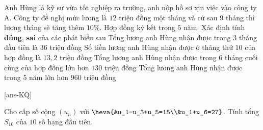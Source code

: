 \begin{ex}%
	Anh Hùng là kỹ sư vừa tốt nghiệp ra trường, anh nộp hồ sơ xin việc vào công ty A. Công ty đề nghị mức lương là $12$ triệu đồng một tháng và cứ sau $9$ tháng thì lương tháng sẽ tăng thêm $10\%$. Hợp đồng ký kết trong $5$ năm. Xác định tính \textbf{đúng}, \textbf{sai} của các phát biểu sau
	\choiceTF
	{\True Tổng lương anh Hùng nhận được trong $3$ tháng đầu tiên là $36$ triệu đồng}
	{\True Số tiền lương anh Hùng nhận được ở tháng thứ $10$ của hợp đồng là $13{,}2$ triệu đồng}
	{Tổng lương anh Hùng nhận được trong $6$ tháng cuối cùng của hợp đồng lớn hơn $130$ triệu đồng}
	{\True Tổng lương anh Hùng nhận được trong $5$ năm lớn hơn $960$ triệu đồng}
\end{ex}



\caukq

[ans-KQ]

\begin{ex}%
	Cho cấp số cộng $(u_n)$ với $\heva{&u_1-u_3+u_5=15\\&u_1+u_6=27}$. Tính tổng $S_{10}$ của $10$ số hạng đầu tiên.
\end{ex}

